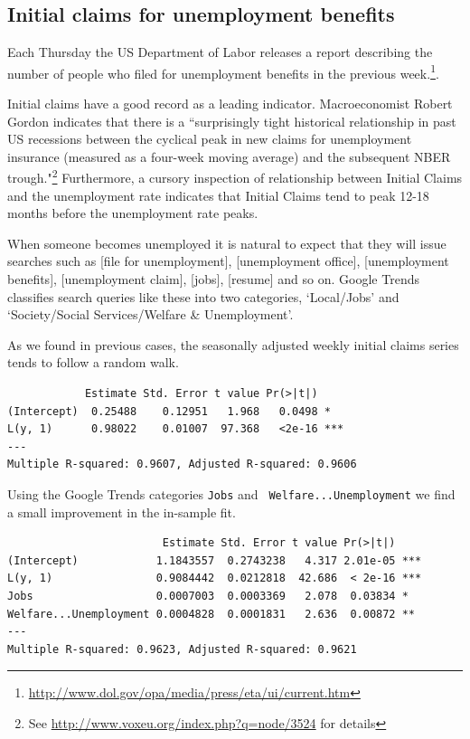 \documentclass[12pt, oneside]{article}
\begin{document}
\subsection{Initial claims for unemployment benefits}
Each Thursday the US Department of Labor releases a report describing
the number of people who filed for unemployment benefits in the
previous
week.\footnote{\url{http://www.dol.gov/opa/media/press/eta/ui/current.htm}}.

Initial claims have a good record as a leading
indicator. Macroeconomist Robert Gordon indicates that there is a
``surprisingly tight historical relationship in past US recessions
between the cyclical peak in new claims for unemployment insurance
(measured as a four-week moving average) and the subsequent NBER
trough."\footnote{See \url{http://www.voxeu.org/index.php?q=node/3524}
  for details} Furthermore, a cursory inspection of relationship
between Initial Claims and the unemployment rate indicates that
Initial Claims tend to peak 12-18 months before the unemployment rate
peaks.

When someone becomes unemployed it is natural to expect that they will
issue searches such as [file for unemployment], [unemployment office],
[unemployment benefits], [unemployment claim], [jobs], [resume] and so
on. Google Trends classifies search queries like these into two
categories, `Local/Jobs' and `Society/Social Services/Welfare \&
Unemployment'.

As we found in previous cases, the seasonally adjusted weekly initial
claims series tends to follow a random walk.

\small
\begin{verbatim}
            Estimate Std. Error t value Pr(>|t|)    
(Intercept)  0.25488    0.12951   1.968   0.0498 *  
L(y, 1)      0.98022    0.01007  97.368   <2e-16 ***
---
Multiple R-squared: 0.9607,	Adjusted R-squared: 0.9606 
\end{verbatim}
\normalsize

Using the Google Trends categories {\tt Jobs} and {\tt
  Welfare...Unemployment} we find a small improvement in the in-sample
fit.

\small
\begin{verbatim}
                        Estimate Std. Error t value Pr(>|t|)    
(Intercept)            1.1843557  0.2743238   4.317 2.01e-05 ***
L(y, 1)                0.9084442  0.0212818  42.686  < 2e-16 ***
Jobs                   0.0007003  0.0003369   2.078  0.03834 *  
Welfare...Unemployment 0.0004828  0.0001831   2.636  0.00872 ** 
---
Multiple R-squared: 0.9623,	Adjusted R-squared: 0.9621 
\end{verbatim}
\normalsize
\end{document}

